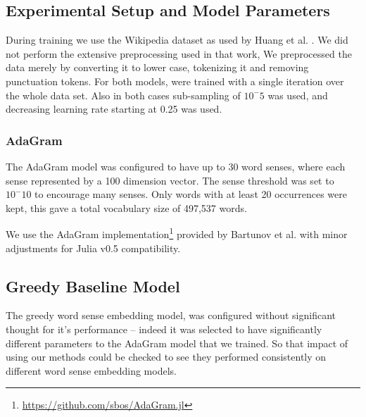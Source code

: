 \documentclass{sig-alternate}
\begin{document}
\subsection{Experimental Setup and Model Parameters}
During training we use the Wikipedia dataset as used by Huang et al. \parencite{Huang2012}.
We did not perform the extensive preprocessing used in that work,
We preprocessed the data merely by converting it to lower case, tokenizing it and removing punctuation tokens.
For both models, were trained with a single iteration over the whole data set.
Also in both cases sub-sampling of $10^-5$ was used, and decreasing learning rate starting at 0.25 was used.


\subsubsection{AdaGram}
The AdaGram model was configured to have up to 30 word senses, where each sense represented by a 100 dimension vector. The sense threshold was set to $10^-10$ to encourage many senses.
Only words with at least 20 occurrences were kept, this gave a total vocabulary size of 497,537 words.

We use the AdaGram \parencite{AdaGrams} implementation\footnote{\url{https://github.com/sbos/AdaGram.jl}} provided by Bartunov et al. with minor adjustments for Julia \parencite{Julia} v0.5 compatibility.



\subsection{Greedy Baseline Model}
The greedy word sense embedding model, was configured without significant thought for it's performance -- indeed it was selected to have significantly different parameters to the AdaGram model that we trained. So that impact of using our methods could be checked to see they performed consistently on different word sense embedding models.
\end{document}
